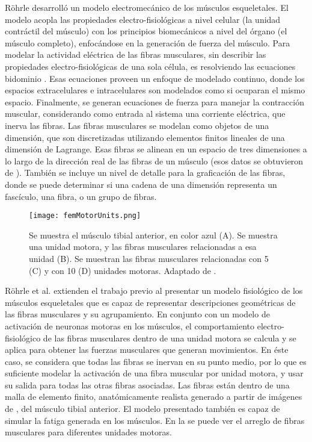 R{\"o}hrle \citep{rohrle2010simulating} desarrolló un modelo electromecánico de los músculos esqueletales. El modelo acopla las propiedades electro-fisiológicas a nivel celular (la unidad contráctil del músculo) con los principios biomecánicos a nivel del órgano (el músculo completo), enfocándose en la generación de fuerza del músculo. Para modelar la actividad eléctrica de las fibras musculares, sin describir las propiedades electro-fisiológicas de una sola célula, es resolviendo las ecuaciones bidominio \citep{vigmond2002computational, rohrle2010simulating, rohrle2012physiologically}. Esas ecuaciones proveen un enfoque de modelado continuo, donde los espacios extracelulares e intracelulares son modelados como si ocuparan el mismo espacio. Finalmente, se generan ecuaciones de fuerza para manejar la contracción muscular, considerando como entrada al sistema una corriente eléctrica, que inerva las fibras. Las fibras musculares se modelan como objetos de una dimensión, que son discretizadas utilizando elementos finitos lineales de una dimensión de Lagrange. Esas fibras se alinean en un espacio de tres dimensiones a lo largo de la dirección real de las fibras de un músculo (esos datos se obtuvieron de \citep{visibleHumanProject}). También se incluye un nivel de detalle para la graficación de las fibras, donde se puede determinar si una cadena de una dimensión representa un fascículo, una fibra, o un grupo de fibras.

\begin{figure}
	\centering
		\texttt{[image: femMotorUnits.png]}
	\caption[Simulación de fibras musculares y las unidades motoras relacionadas.]{Se muestra el músculo tibial anterior, en color azul (A). Se muestra una unidad motora, y las fibras musculares relacionadas a esa unidad (B). Se muestran las fibras musculares relacionadas con 5 (C) y con 10 (D) unidades motoras. Adaptado de \citep{rohrle2012physiologically}.}
		\label{fig:femMotorUnits}
\end{figure}

R{\"o}hrle et al. \citep{rohrle2012physiologically} extienden el trabajo previo al presentar un modelo fisiológico de los músculos esqueletales que es capaz de representar descripciones geométricas de las fibras musculares y su agrupamiento. En conjunto con un modelo de activación de neuronas motoras en los músculos, el comportamiento electro-fisiológico de las fibras musculares dentro de una unidad motora se calcula y se aplica para obtener las fuerzas musculares que generan movimientos. En éste caso, se considera que todas las fibras se inervan en su punto medio, por lo que es suficiente modelar la activación de una fibra muscular por unidad motora, y usar su salida para todas las otras fibras asociadas. Las fibras están dentro de una malla de elemento finito, anatómicamente realista generado a partir de imágenes de \citep{visibleHumanProject}, del músculo tibial anterior. El modelo presentado también es capaz de simular la fatiga generada en los músculos. En la  se puede ver el arreglo de fibras musculares para diferentes unidades motoras.

